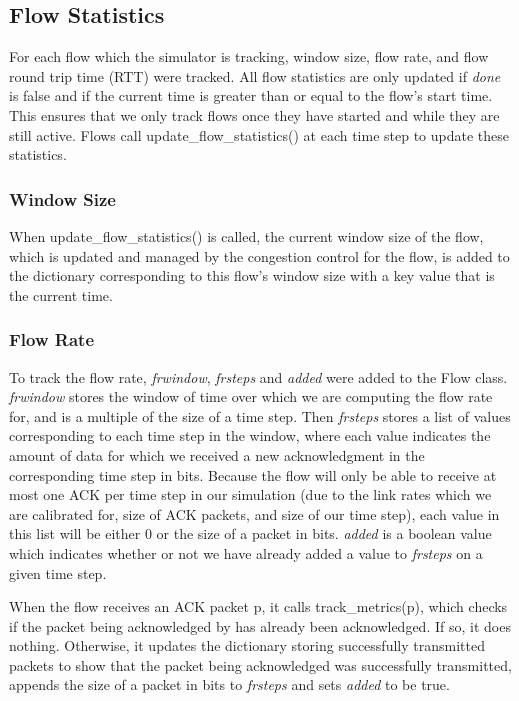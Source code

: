 \documentclass{article}
\begin{document}
\subsection{Flow Statistics}
For each flow which the simulator is tracking, window size, flow rate, and flow round trip time (RTT) were tracked. All flow statistics are only updated if {\em done} is false and if the current time is greater than or equal to the flow's start time. This ensures that we only track flows once they have started and while they are still active. Flows call update\_flow\_statistics() at each time step to update these statistics. 

\subsubsection{Window Size} 
When update\_flow\_statistics() is called, the current window size of the flow, which is updated and managed by the congestion control for the flow, is added to the dictionary corresponding to this flow's window size with a key value that is the current time. 

\subsubsection{Flow Rate}
To track the flow rate, {\em frwindow}, {\em frsteps} and {\em added} were added to the Flow class.  {\em frwindow} stores the window of time over which we are computing the flow rate for, and is a multiple of the size of a time step. Then {\em frsteps} stores a list of values corresponding to each time step in the window, where each value indicates the amount of data for which we received a new acknowledgment in the corresponding time step in bits. Because the flow will only be able to receive at most one ACK per time step in our simulation (due to the link rates which we are calibrated for, size of ACK packets, and size of our time step), each value in this list will be either 0 or the size of a packet in bits. {\em added} is a boolean value which indicates whether or not we have already added a value to {\em frsteps} on a given time step. 

When the flow receives an ACK packet p, it calls track\_metrics(p), which checks if the packet being acknowledged by has already been acknowledged. If so, it does nothing. Otherwise, it updates the dictionary storing successfully transmitted packets to show that the packet being acknowledged was successfully transmitted, appends the size of a packet in bits to {\em frsteps} and sets {\em added} to be true. 
\end{document}
